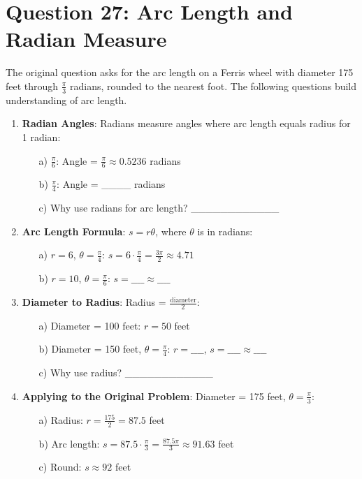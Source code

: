 \documentclass[12pt]{article}
\begin{document}
\section*{Question 27: Arc Length and Radian Measure}
The original question asks for the arc length on a Ferris wheel with diameter 175 feet through \( \frac{\pi}{3} \) radians, rounded to the nearest foot. The following questions build understanding of arc length.

\begin{enumerate}[label=27.\arabic*]
    \item \textbf{Radian Angles}: Radians measure angles where arc length equals radius for 1 radian:
    \begin{enumerate}
        \item[a)] \( \frac{\pi}{6} \): Angle = \( \frac{\pi}{6} \approx 0.5236 \) radians
        \item[b)] \( \frac{\pi}{4} \): Angle = \_\_\_\_ radians
        \item[c)] Why use radians for arc length? \_\_\_\_\_\_\_\_\_\_\_\_
    \end{enumerate}
    \item \textbf{Arc Length Formula}: \( s = r\theta \), where \( \theta \) is in radians:
    \begin{enumerate}
        \item[a)] \( r = 6 \), \( \theta = \frac{\pi}{4} \): \( s = 6 \cdot \frac{\pi}{4} = \frac{3\pi}{2} \approx 4.71 \)
        \item[b)] \( r = 10 \), \( \theta = \frac{\pi}{6} \): \( s = \_\_\_\_ \approx \_\_\_\_ \)
    \end{enumerate}
    \item \textbf{Diameter to Radius}: Radius = \( \frac{\text{diameter}}{2} \):
    \begin{enumerate}
        \item[a)] Diameter = 100 feet: \( r = 50 \) feet
        \item[b)] Diameter = 150 feet, \( \theta = \frac{\pi}{4} \): \( r = \_\_\_\_ \), \( s = \_\_\_\_ \approx \_\_\_\_ \)
        \item[c)] Why use radius? \_\_\_\_\_\_\_\_\_\_\_\_
    \end{enumerate}
    \item \textbf{Applying to the Original Problem}: Diameter = 175 feet, \( \theta = \frac{\pi}{3} \):
    \begin{enumerate}
        \item[a)] Radius: \( r = \frac{175}{2} = 87.5 \) feet
        \item[b)] Arc length: \( s = 87.5 \cdot \frac{\pi}{3} = \frac{87.5\pi}{3} \approx 91.63 \) feet
        \item[c)] Round: \( s \approx 92 \) feet
    \end{enumerate}
\end{enumerate}
\end{document}
